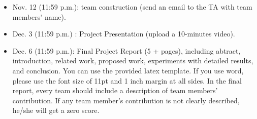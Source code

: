 \documentclass{article}
\begin{document}
\begin{itemize}
  \item Nov. 12 (11:59 p.m.): team construction (send an email to the TA with team members' name).
  \item Dec. 3 (11:59 p.m.) : Project Presentation (upload a 10-minutes video).
  \item Dec. 6 (11:59 p.m.): Final Project Report (5 + pages), including abtract, introduction, related work, proposed work, experiments with detailed results, and conclusion. You can use the provided latex template. If you use word, please use the font size of 11pt and 1 inch margin at all sides. In the final report, every team should include a description of team members' contribution. If any team member's contribution is not clearly described, he/she will get a zero score. 
\end{itemize}



\end{document}
